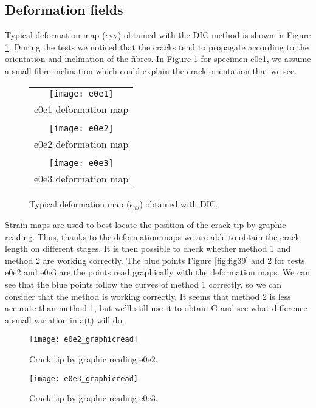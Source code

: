 \subsection{Deformation fields}

Typical deformation map ($\epsilon$yy) obtained with the DIC method is shown in Figure \ref{fig:Strain_def}.
During the tests we noticed that the cracks tend to propagate according to the orientation and inclination of the fibres.
In Figure \ref{fig:Strain_def} for specimen e0e1, we assume a small fibre inclination which could explain the crack orientation that we see.

\begin{figure}[htp]
	\centering
	\begin{tabular}{c}
		\texttt{[image: e0e1]} \\
		e0e1 deformation map \\
		\\
		\texttt{[image: e0e2]} \\
		e0e2 deformation map \\
		\\
		\texttt{[image: e0e3]} \\
		e0e3 deformation map \\
	\end{tabular}
	\caption{Typical deformation map ($\epsilon_{yy}$) obtained with DIC.}
	\label{fig:Strain_def}
\end{figure}

Strain maps are used to best locate the position of the crack tip by graphic reading.
Thus, thanks to the deformation maps we are able to obtain the crack length on different stages. It is then possible to check whether method 1 and method 2 are working correctly.
The blue points Figure \ref{fig:fig39} and \ref{fig:fig40} for tests e0e2 and e0e3 are the points read graphically with the deformation maps. We can see that the blue points follow the curves of method 1 correctly, so we can consider that the method is working correctly.
It seems that method 2 is less accurate than method 1, but we'll still use it to obtain G and see what difference a small variation in a(t) will do.

\begin{figure}[htp]
	\begin{minipage}[c]{.46\linewidth}
		\centering
		\texttt{[image: e0e2\_graphicread]}
		\caption{Crack tip by graphic reading e0e2.}
		\label{fig:fig39}
	\end{minipage}
	\hfill%
	\begin{minipage}[c]{.46\linewidth}
		\centering
		\texttt{[image: e0e3\_graphicread]}
		\caption{Crack tip by graphic reading e0e3.}
		\label{fig:fig40}
	\end{minipage}
\end{figure}


